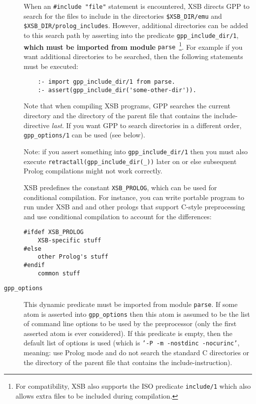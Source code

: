 \begin{description}
  When an \verb|#include "file"| statement is encountered, XSB directs
  GPP to search for the files to include in the
  directories \verb|$XSB_DIR/emu| and
  \verb|$XSB_DIR/prolog_includes|. 
  However, additional directories can be added to this search path by
  asserting into the predicate \verb|gpp_include_dir/1|, {\bf which
    must be imported from module} {\tt parse}~\footnote{For
    compatibility, XSB also supports the ISO predicate {\tt include/1}
    which also allows extra files to be included during compilation.}.
%  
  For example if you want additional directories to be searched, then
  the following statements must be executed:
\begin{verbatim}
    :- import gpp_include_dir/1 from parse.
    :- assert(gpp_include_dir('some-other-dir')).
\end{verbatim}

  Note that when compiling XSB programs, GPP searches the current
  directory and the directory of the parent file that contains the
  include-directive \emph{last}. 
  If you want GPP to search directories in a different order, {\tt
    gpp\_options/1} can be used (see below).

  Note: if you assert something into \texttt{gpp\_include\_dir/1} then you
  must also execute {\tt retractall(gpp\_include\_dir(\_))} later on or
  else subsequent Prolog compilations might not work correctly.

  XSB predefines the constant {\tt XSB\_PROLOG}, which can be used for
  conditional compilation. For instance, you can write portable program
  to run under XSB and and other prologs that support C-style
  preprocessing and use conditional compilation to account for the
  differences: 
  \begin{samepage}
  \begin{verbatim}
#ifdef XSB_PROLOG
    XSB-specific stuff
#else
    other Prolog's stuff
#endif
    common stuff
  \end{verbatim}
  \end{samepage}

\item[{\tt gpp\_options}]  This
  dynamic predicate must be imported from module {\tt parse}.  If some
  atom is asserted into {\tt gpp\_options} then this atom is assumed
  to be the list of command line options to be used by the
  preprocessor (only the first asserted atom is ever considered). If
  this predicate is empty, then the default list of options is used
  (which is {\tt '-P -m -nostdinc -nocurinc'}, meaning: use Prolog
  mode and do not search the standard C directories or the directory
  of the parent file that contains the include-instruction).
  

\end{description}
